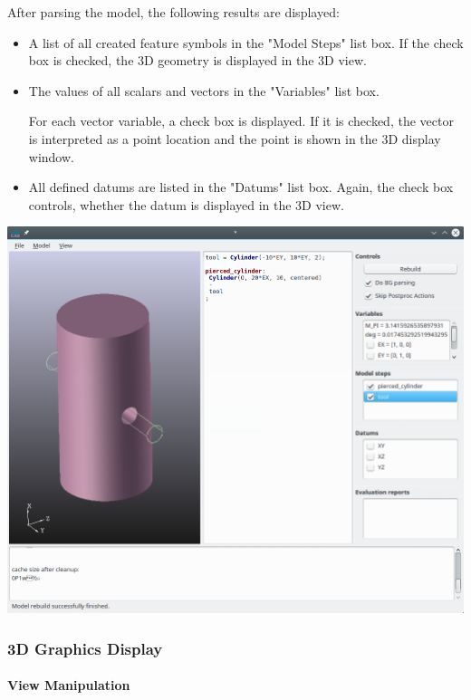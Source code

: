 After parsing the model, the following results are displayed:

\begin{itemize}
\item A list of all created feature symbols in the "Model Steps" list box.
    If the check box is checked, the 3D geometry is displayed in the
    3D view.
\item The values of all scalars and vectors in the "Variables" list box.

    For each vector variable, a check box is displayed. If it is
    checked, the vector is interpreted as a point location and the point
    is shown in the 3D display window.

\item All defined datums are listed in the "Datums" list box. Again, the
    check box controls, whether the datum is displayed in the 3D view.
\end{itemize}
 

\includegraphics[width=\linewidth]{figs/iscad/screenshot_iscad}

\subsubsection{3D Graphics Display}

\paragraph{View Manipulation}

